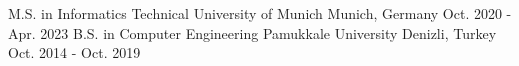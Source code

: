 

\begin{cventries}

  \cventry
    {M.S. in Informatics} %
    {Technical University of Munich} %
    {Munich, Germany} %
    {Oct. 2020 - Apr. 2023} %
    {}
  \cventry
    {B.S. in Computer Engineering} %
    {Pamukkale University} %
    {Denizli, Turkey} %
    {Oct. 2014 - Oct. 2019} %
    {}
\end{cventries}

